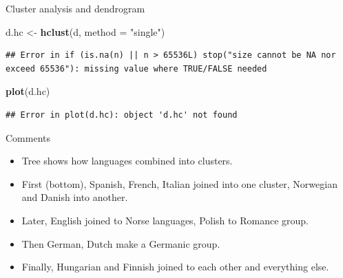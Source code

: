 \documentclass[ignorenonframetext,]{beamer}
\newenvironment{Shaded}{\begin{snugshade}}{\end{snugshade}}
\newcommand{\DataTypeTok}[1]{\textcolor[rgb]{0.13,0.29,0.53}{#1}}
\newcommand{\KeywordTok}[1]{\textcolor[rgb]{0.13,0.29,0.53}{\textbf{#1}}}
\newcommand{\NormalTok}[1]{#1}
\newcommand{\StringTok}[1]{\textcolor[rgb]{0.31,0.60,0.02}{#1}}
\begin{document}
\begin{frame}[fragile]{Cluster analysis and dendrogram}
\protect\hypertarget{cluster-analysis-and-dendrogram}{}

\begin{Shaded}
\begin{Highlighting}[]
\NormalTok{d.hc <-}\StringTok{ }\KeywordTok{hclust}\NormalTok{(d, }\DataTypeTok{method =} \StringTok{"single"}\NormalTok{)}
\end{Highlighting}
\end{Shaded}

\begin{verbatim}
## Error in if (is.na(n) || n > 65536L) stop("size cannot be NA nor exceed 65536"): missing value where TRUE/FALSE needed
\end{verbatim}

\begin{Shaded}
\begin{Highlighting}[]
\KeywordTok{plot}\NormalTok{(d.hc)}
\end{Highlighting}
\end{Shaded}

\begin{verbatim}
## Error in plot(d.hc): object 'd.hc' not found
\end{verbatim}

\end{frame}

\begin{frame}{Comments}
\protect\hypertarget{comments-20}{}

\begin{itemize}
\item
  Tree shows how languages combined into clusters.
\item
  First (bottom), Spanish, French, Italian joined into one cluster,
  Norwegian and Danish into another.
\item
  Later, English joined to Norse languages, Polish to Romance group.
\item
  Then German, Dutch make a Germanic group.
\item
  Finally, Hungarian and Finnish joined to each other and everything
  else.
\end{itemize}

\end{frame}
\end{document}
